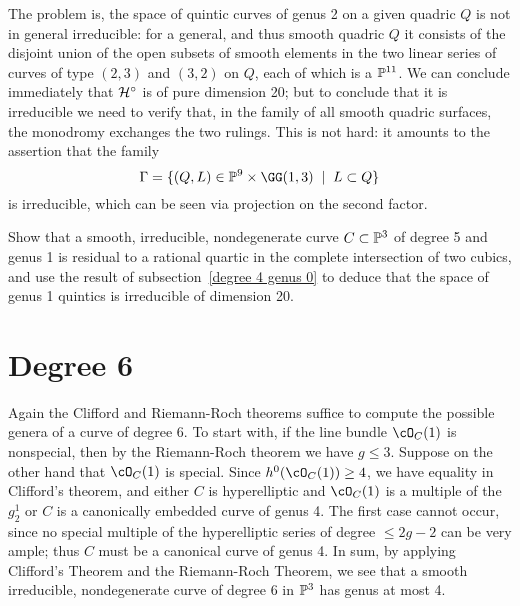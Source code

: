 The problem is, the space of quintic curves of genus 2 on a given quadric $Q$ is not in general irreducible: for a general, and thus smooth quadric $Q$ it consists of the disjoint union of the open subsets of smooth elements in the two linear series of curves of type $(2,3)$ and $(3,2)$ on $Q$, each of which is a $\PP^{11}$. We can conclude immediately that $\cH^\circ$ is of pure dimension 20; but to conclude that it is irreducible we need to verify that, in the family of all smooth quadric surfaces, the monodromy exchanges the two rulings.  This is not hard: it amounts to the assertion that the family
$$
\Gamma = \{ (Q,L) \in \PP^9 \times \GG(1,3) \; \mid \; L \subset Q \}
$$
is irreducible, which can be seen via projection on the second factor.


\begin{exercise}
Show that a smooth, irreducible, nondegenerate curve $C \subset \PP^3$ of degree 5 and genus 1 is residual to a rational quartic in the complete intersection of two cubics, and use the result of subsection~\ref{degree 4 genus 0} to deduce that the space of genus 1 quintics is irreducible of dimension 20.
\end{exercise}

\section{Degree 6}

Again the Clifford and Riemann-Roch theorems suffice to compute the possible genera of a curve of degree 6. To start with,  if the line bundle $\cO_C(1)$ is nonspecial, then by the Riemann-Roch theorem we have $g \leq 3$. Suppose on the other hand that $\cO_C(1)$ is special. Since   $h^{0}(\cO_C(1)) \geq 4$, we have equality in Clifford's theorem, and either $C$ is hyperelliptic and $\cO_C(1)$ is a multiple of the $g^{1}_{2}$ or  $C$ is  a canonically embedded curve of genus 4. The first case cannot occur, since no special multiple of the hyperelliptic series of degree $\leq 2g-2$ can be very ample; thus $C$ must be a canonical curve of genus 4. In sum, by applying Clifford's Theorem and the Riemann-Roch Theorem, we see that a smooth irreducible, nondegenerate curve of degree 6 in $\PP^3$ has genus at most 4.

